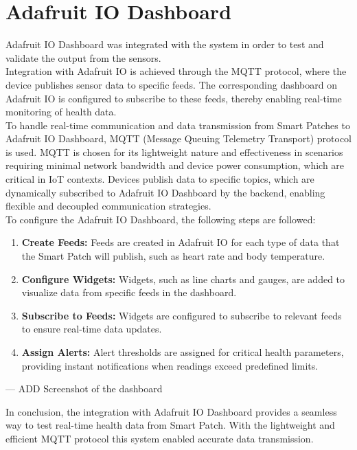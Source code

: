 \chapter{Adafruit IO Dashboard}
\label{app:adafruit}

Adafruit IO Dashboard was integrated with the system in order to test and validate the output from the sensors. \\


\noindent Integration with Adafruit IO is achieved through the MQTT protocol, where the device publishes sensor data to specific feeds. The corresponding dashboard on Adafruit IO is configured to subscribe to these feeds, thereby enabling real-time monitoring of health data. \\

\noindent To handle real-time communication and data transmission from Smart Patches to Adafruit IO Dashboard, MQTT (Message Queuing Telemetry Transport) protocol is used. MQTT is chosen for its lightweight nature and effectiveness in scenarios requiring minimal network bandwidth and device power consumption, which are critical in IoT contexts. Devices publish data to specific topics, which are dynamically subscribed to Adafruit IO Dashboard by the backend, enabling flexible and decoupled communication strategies. \\


\noindent To configure the Adafruit IO Dashboard, the following steps are followed:
\begin{enumerate}
    \item \textbf{Create Feeds:} Feeds are created in Adafruit IO for each type of data that the Smart Patch will publish, such as heart rate and body temperature.
    \item \textbf{Configure Widgets:} Widgets, such as line charts and gauges, are added to visualize data from specific feeds in the dashboard.
    \item \textbf{Subscribe to Feeds:} Widgets are configured to subscribe to relevant feeds to ensure real-time data updates.
    \item \textbf{Assign Alerts:} Alert thresholds are assigned for critical health parameters, providing instant notifications when readings exceed predefined limits.
\end{enumerate}


--- ADD Screenshot of the dashboard

\noindent In conclusion, the integration with Adafruit IO Dashboard provides a seamless way to test real-time health data from Smart Patch. With the lightweight and efficient MQTT protocol this system enabled accurate data transmission.





